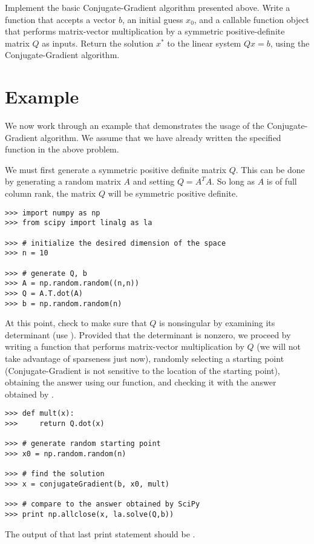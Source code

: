\begin{problem}
Implement the basic Conjugate-Gradient algorithm presented above. Write a function  that accepts a vector $b$, an initial
guess $x_0$, and a callable function
object that performs matrix-vector multiplication by a symmetric positive-definite matrix $Q$ as inputs.
Return the solution $x^*$ to the linear system $Qx = b$, using the Conjugate-Gradient algorithm.
\end{problem}

\section*{Example}
We now work through an example that demonstrates the usage of the Conjugate-Gradient algorithm. We assume that we have already written
the specified function in the above problem.

We must first generate a symmetric positive definite matrix $Q$. This can be done by generating a random matrix $A$ and setting $Q = A^TA$.
So long as $A$ is of full column rank, the matrix $Q$ will be symmetric positive definite.
\begin{lstlisting}
>>> import numpy as np
>>> from scipy import linalg as la

>>> # initialize the desired dimension of the space
>>> n = 10

>>> # generate Q, b
>>> A = np.random.random((n,n))
>>> Q = A.T.dot(A)
>>> b = np.random.random(n)
\end{lstlisting}
At this point, check to make sure that $Q$ is nonsingular by examining its determinant (use ).
Provided that the determinant is nonzero, we proceed by writing a function that performs matrix-vector multiplication by $Q$ (we
will not take advantage of sparseness just now), randomly selecting a starting point (Conjugate-Gradient is not sensitive to the location of
the starting point), obtaining the answer using our function, and checking it with the answer obtained by .
\begin{lstlisting}
>>> def mult(x):
>>>     return Q.dot(x)

>>> # generate random starting point
>>> x0 = np.random.random(n)

>>> # find the solution
>>> x = conjugateGradient(b, x0, mult)

>>> # compare to the answer obtained by SciPy
>>> print np.allclose(x, la.solve(Q,b))
\end{lstlisting}
The output of that last print statement should be .

